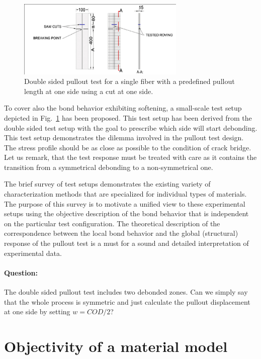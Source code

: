 \documentclass[main.tex]{subfiles}
\begin{document}
\begin{figure}[tb]
	\centering
  \includegraphics[trim={1mm 1mm 1mm 1mm},clip,width=8cm]{fig/Lecture02/pullout_with_cut.png}
	\caption{Double sided pullout test for a single fiber with a predefined pullout length at one side
	using a cut at one side.}
	\label{fig:pullout_with_cut}
\end{figure}

To cover also the bond behavior exhibiting softening, a small-scale test 
setup depicted in Fig.~\ref{fig:pullout_with_cut} has been proposed. 
This test setup has been derived from the double sided test setup with the 
goal to prescribe which side will start debonding. This test setup demonstrates
the dilemma involved in the pullout test design. The stress profile should be
as close as possible to the condition of crack bridge.
Let us remark, that
the test response must be treated with care as it contains the transition
from a symmetrical debonding to a non-symmetrical one.

The brief survey of test setups demonstrates the existing variety of 
characterization methods that are specialized for individual types of 
materials. The purpose of this survey is to motivate a unified
view to these experimental setups using the objective description of the bond behavior that 
is independent on the particular test configuration. 
The theoretical description of the correspondence between the 
local bond behavior and the global (structural) response of the pullout test
is a must for a sound and detailed interpretation of experimental data.

\paragraph{Question:}
The double sided pullout test includes two debonded zones. 
Can we simply say that the whole process is symmetric and just 
calculate the pullout displacement at one side by setting $w = COD/2$?


\section{Objectivity of a material model}
\end{document}
